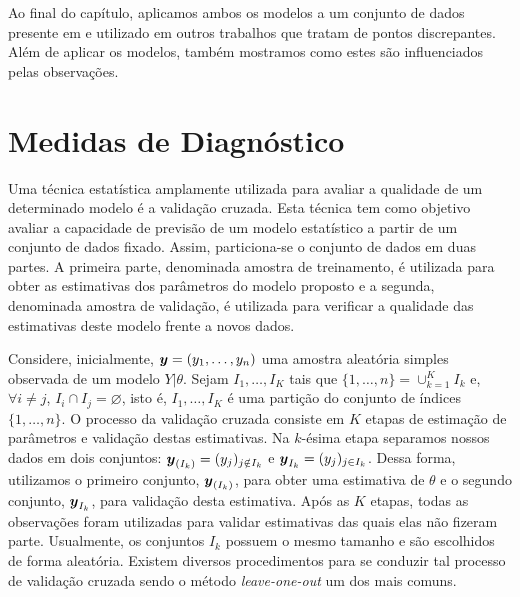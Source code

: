 Ao final do capítulo, aplicamos ambos os modelos a um conjunto de dados presente em \citet{WeissCho1998} e utilizado em outros trabalhos que tratam de pontos discrepantes. Além de aplicar os modelos, também mostramos como estes são influenciados pelas observações. 

\section{Medidas de Diagnóstico}

Uma técnica estatística amplamente utilizada para avaliar a qualidade de um determinado modelo é a validação cruzada. Esta técnica tem como objetivo avaliar a capacidade de previsão de um modelo estatístico a partir de um conjunto de dados fixado. Assim, particiona-se o conjunto de dados em duas partes. A primeira parte, denominada amostra de treinamento, é utilizada para obter as estimativas dos parâmetros do modelo proposto e a segunda, denominada amostra de validação, é utilizada para verificar a qualidade das estimativas deste modelo frente a novos dados.

Considere, inicialmente, ${\boldsymbol{y}}=(y_1,\ldots,y_n)$ uma amostra aleatória simples observada de um modelo $Y|\theta$. Sejam $I_1,\ldots,I_K$ tais que $\{1,\ldots,n\} = \cup_{k = 1}^K I_k$ e, $\forall i\neq j$, $I_i\cap I_j=\varnothing$, isto é, $I_1,\ldots,I_K$ é uma partição do conjunto de índices $\{1,\ldots,n\}$. O processo da validação cruzada consiste em $K$ etapas de estimação de parâmetros e validação destas estimativas.  Na $k$-ésima etapa separamos nossos dados em dois conjuntos: ${\boldsymbol{y}}_{(I_k)}=(y_j)_{j\notin I_k}$ e ${\boldsymbol{y}}_{I_k}=(y_j)_{j\in I_k}$. Dessa forma, utilizamos o primeiro conjunto, ${\boldsymbol{y}}_{(I_k)}$, para obter uma estimativa de $\theta$ e o segundo conjunto, ${\boldsymbol{y}}_{I_k}$, para validação desta estimativa. Após as $K$ etapas, todas as observações foram utilizadas para validar estimativas das quais elas não fizeram parte. Usualmente, os conjuntos $I_k$ possuem o mesmo tamanho e são escolhidos de forma aleatória. Existem diversos procedimentos para se conduzir tal processo de validação cruzada sendo o método \textit{leave-one-out} um dos mais comuns.

